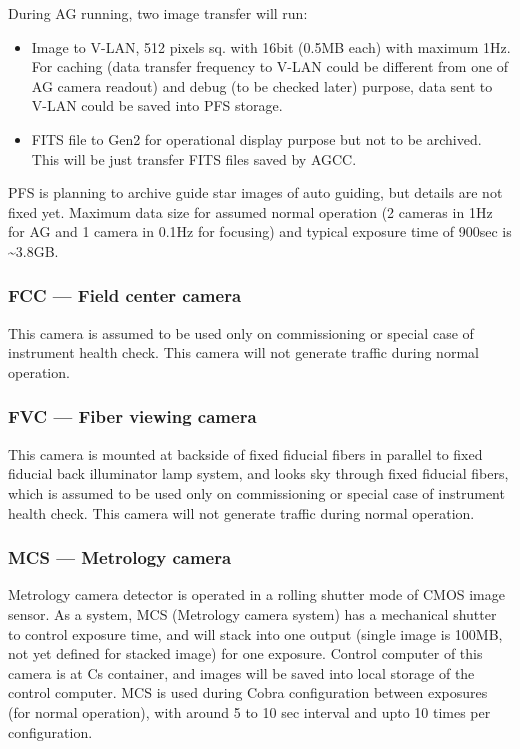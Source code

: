 \documentclass[a4paper,notitlepage]{article}
\begin{document}
During AG running, two image transfer will run: 
\begin{itemize}
  \item Image to V-LAN, 512 pixels sq. with 16bit (0.5MB each) with maximum 1Hz.
    For caching (data transfer frequency to V-LAN could be different from one 
    of AG camera readout) and debug (to be checked later) purpose, data sent 
    to V-LAN could be saved into PFS storage. 
  \item FITS file to Gen2 for operational display purpose but not to be 
    archived. This will be just transfer FITS files saved by AGCC. 
\end{itemize}

PFS is planning to archive guide star images of auto guiding, but details are 
not fixed yet. Maximum data size for assumed normal operation (2 cameras in 
1Hz for AG and 1 camera in 0.1Hz for focusing) and typical exposure time of 
900sec is \~{}3.8GB. 


\subsubsection{FCC --- Field center camera}

This camera is assumed to be used only on commissioning or special case of 
instrument health check.
This camera will not generate traffic during normal operation. 


\subsubsection{FVC --- Fiber viewing camera}

This camera is mounted at backside of fixed fiducial fibers in parallel to 
fixed fiducial back illuminator lamp system, and looks sky through fixed 
fiducial fibers, which is assumed to be used only on commissioning or special 
case of instrument health check. 
This camera will not generate traffic during normal operation. 

\subsubsection{MCS --- Metrology camera}

Metrology camera detector is operated in a rolling shutter mode of CMOS image 
sensor. As a system, MCS (Metrology camera system) has a mechanical shutter 
to control exposure time, and will stack into one output (single image is 
100MB, not yet defined for stacked image) for one exposure. 
Control computer of this camera is at Cs container, and images will be saved 
into local storage of the control computer. MCS is used during Cobra 
configuration between exposures (for normal operation), with around 5 to 10 sec 
interval and upto 10 times per configuration. 
\end{document}
